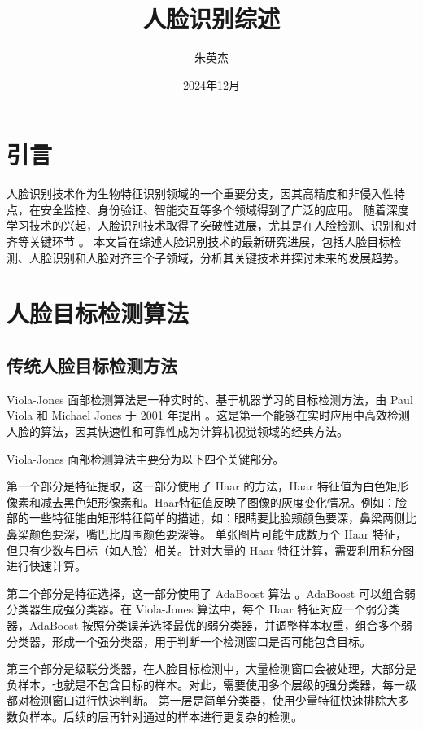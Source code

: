 \documentclass[a4paper]{article}
\author{朱英杰}
\date{2024年12月}
\title{人脸识别综述}
\begin{document}
\maketitle

\section{引言}
人脸识别技术作为生物特征识别领域的一个重要分支，因其高精度和非侵入性特点，在安全监控、身份验证、智能交互等多个领域得到了广泛的应用。
随着深度学习技术的兴起，人脸识别技术取得了突破性进展，尤其是在人脸检测、识别和对齐等关键环节\cite{wanyonyi2022open} \cite{wang2022survey}。
本文旨在综述人脸识别技术的最新研究进展，包括人脸目标检测、人脸识别和人脸对齐三个子领域，分析其关键技术并探讨未来的发展趋势。

\section{人脸目标检测算法}

\subsection{传统人脸目标检测方法}

Viola-Jones 面部检测算法是一种实时的、基于机器学习的目标检测方法，由 Paul Viola 和 Michael Jones 于 2001 年提出\cite{wang2014analysis} \cite{priya2023viola} \cite{abdulhussien2022evaluation}
\cite{katke2020face}。这是第一个能够在实时应用中高效检测人脸的算法，因其快速性和可靠性成为计算机视觉领域的经典方法。

Viola-Jones 面部检测算法主要分为以下四个关键部分。

第一个部分是特征提取，这一部分使用了 Haar 的方法\cite{soo2014object}\cite{lienhart2002extended}，Haar 特征值为白色矩形像素和减去黑色矩形像素和。Haar特征值反映了图像的灰度变化情况。例如：脸部的一些特征能由矩形特征简单的描述，如：眼睛要比脸颊颜色要深，鼻梁两侧比鼻梁颜色要深，嘴巴比周围颜色要深等。
单张图片可能生成数万个 Haar 特征，但只有少数与目标（如人脸）相关。针对大量的 Haar 特征计算，需要利用积分图进行快速计算。

第二个部分是特征选择，这一部分使用了 AdaBoost 算法\cite{ying2013advance} \cite{schapire2013explaining} \cite{hu2008adaboost}。AdaBoost 可以组合弱分类器生成强分类器。在 Viola-Jones 算法中，每个 Haar 特征对应一个弱分类器，AdaBoost 按照分类误差选择最优的弱分类器，并调整样本权重，组合多个弱分类器，形成一个强分类器，用于判断一个检测窗口是否可能包含目标。

第三个部分是级联分类器，在人脸目标检测中，大量检测窗口会被处理，大部分是负样本，也就是不包含目标的样本。对此，需要使用多个层级的强分类器，每一级都对检测窗口进行快速判断。
第一层是简单分类器，使用少量特征快速排除大多数负样本。后续的层再针对通过的样本进行更复杂的检测。
\end{document}
